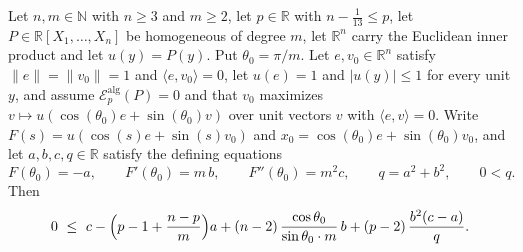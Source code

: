 \begin{lemma}
Let $n,m\in\mathbb{N}$ with $n\ge3$ and $m\ge2$, let $p\in\mathbb{R}$ with
$n-\tfrac1{13}\le p$, let $P\in\mathbb{R}[X_1,\dots,X_n]$ be homogeneous of
degree $m$, let $\mathbb{R}^n$ carry the Euclidean inner product and let
$u(y)=P(y)$. Put $\theta_0=\pi/m$. Let $e,v_0\in\mathbb{R}^n$ satisfy
$\lVert e\rVert=\lVert v_0\rVert=1$ and $\langle e,v_0\rangle=0$, let
$u(e)=1$ and $\lvert u(y)\rvert\le1$ for every unit $y$, and assume
$\mathcal{E}^{\mathrm{alg}}_p(P)=0$ and that $v_0$ maximizes
$v\mapsto u(\cos(\theta_0)e+\sin(\theta_0)v)$ over unit vectors $v$ with
$\langle e,v\rangle=0$. Write
$F(s)=u(\cos(s)e+\sin(s)v_0)$ and $x_0=\cos(\theta_0)e+\sin(\theta_0)v_0$, and
let $a,b,c,q\in\mathbb{R}$ satisfy the defining equations
\[
  F(\theta_0)=-a,\qquad F'(\theta_0)=m\,b,\qquad F''(\theta_0)=m^2c,
  \qquad q=a^2+b^2,\qquad 0<q .
\]
Then
\[
  0\ \le\ c-\Bigl(p-1+\frac{n-p}{m}\Bigr)a
    +(n-2)\,\frac{\cos\theta_0}{\sin\theta_0\cdot m}\,b
    +(p-2)\,\frac{b^2(c-a)}{q}.
\]
\end{lemma}
